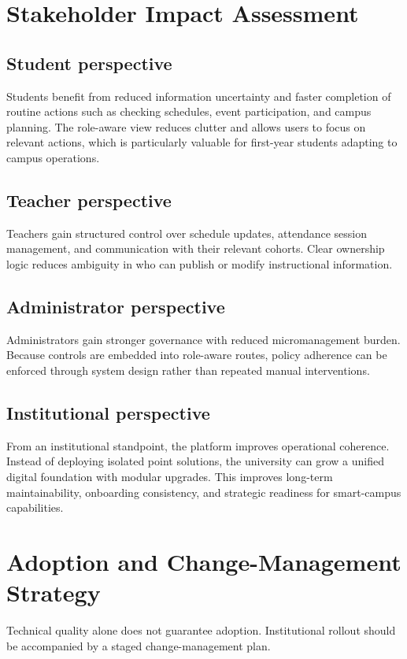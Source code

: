 \documentclass[conference]{IEEEtran}
\begin{document}
\section{Stakeholder Impact Assessment}
\subsection{Student perspective}
Students benefit from reduced information uncertainty and faster completion of routine actions such as checking schedules, event participation, and campus planning. The role-aware view reduces clutter and allows users to focus on relevant actions, which is particularly valuable for first-year students adapting to campus operations.

\subsection{Teacher perspective}
Teachers gain structured control over schedule updates, attendance session management, and communication with their relevant cohorts. Clear ownership logic reduces ambiguity in who can publish or modify instructional information.

\subsection{Administrator perspective}
Administrators gain stronger governance with reduced micromanagement burden. Because controls are embedded into role-aware routes, policy adherence can be enforced through system design rather than repeated manual interventions.

\subsection{Institutional perspective}
From an institutional standpoint, the platform improves operational coherence. Instead of deploying isolated point solutions, the university can grow a unified digital foundation with modular upgrades. This improves long-term maintainability, onboarding consistency, and strategic readiness for smart-campus capabilities.

\section{Adoption and Change-Management Strategy}
Technical quality alone does not guarantee adoption. Institutional rollout should be accompanied by a staged change-management plan.
\end{document}

